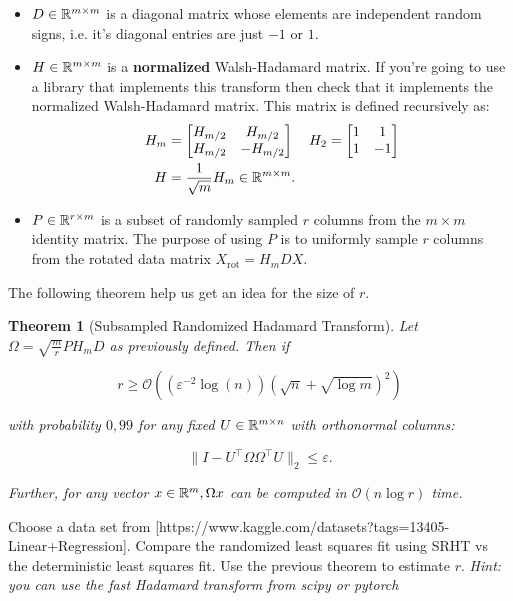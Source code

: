 \documentclass[11pt]{article}
\newcommand\bigO[1]{{\ensuremath{\mathcal{O}(#1)}}}
\newtheorem{theorem}{Theorem}
\begin{document}
\begin{itemize}
    \item $D \in \mathbb{R}^{m \times m}$ is a diagonal matrix whose elements are independent random signs, i.e. it's diagonal entries are just $-1$ or $1$.
    \item $H \in \mathbb{R}^{m \times m}$ is a \textbf{normalized} Walsh-Hadamard matrix. If you're going to use a library that implements this transform then check that it implements the normalized Walsh-Hadamard matrix. This matrix is defined recursively as:
    \begin{align*}
    H_m &= \begin{bmatrix} H_{m/2} & H_{m/2} \\ H_{m/2} & -H_{m/2} \end{bmatrix} & H_2 &= \begin{bmatrix} 1 & 1 \\ 1 & -1 \end{bmatrix} \\
    H &= \frac{1}{\sqrt{m}} H_m \in \mathbb{R}^{m \times m}.
    \end{align*}
    \item $P \in \mathbb{R}^{r \times m}$ is a subset of randomly sampled $r$ columns from the $m \times m$ identity matrix. The purpose of using $P$ is to uniformly sample $r$ columns from the rotated data matrix $X_{\text{rot}} = H_{m}DX$.
\end{itemize}

The following theorem help us get an idea for the size of $r$.

\begin{theorem}[Subsampled Randomized Hadamard Transform]
Let $\Omega = \sqrt{\frac{m}{r}}PH_{m}D$ as previously defined. Then if

\[ r \geq \bigO{( \varepsilon^{-2}\log(n)) (\sqrt{n} + \sqrt{\log{m}})^2 }\]

with probability $0,99$ for any fixed $U \in \mathbb{R}^{m \times n}$ with orthonormal columns:

\[ \| I - U^\top \Omega \Omega^\top U\|_2 \leq \varepsilon. \]

Further, for any vector $x \in \mathbb{R}^{m}, \Omega x$ can be computed in $\bigO{n \log{r}}$ time.

\end{theorem}

Choose a data set from \href{https://www.kaggle.com/datasets?tags=13405-Linear+Regression}[https://www.kaggle.com/datasets?tags=13405-Linear+Regression]. Compare the randomized least squares fit using SRHT vs the deterministic least squares fit. Use the previous theorem to estimate $r$. \textit{Hint: you can use the fast Hadamard transform from scipy or pytorch}
\end{document}
